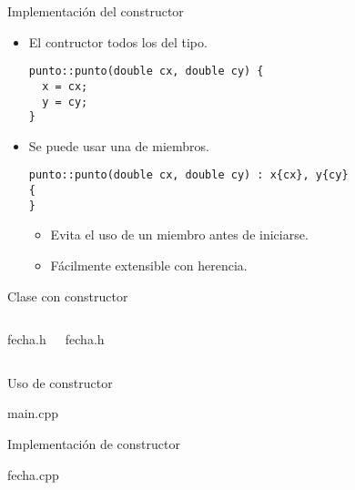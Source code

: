 \begin{frame}[t,fragile]{Implementación del constructor}
\begin{itemize}
  \item El contructor  todos los  del tipo.
\begin{lstlisting}
punto::punto(double cx, double cy) {
  x = cx;
  y = cy;
}
\end{lstlisting}

  \item Se puede usar una  de miembros.
\begin{lstlisting}
punto::punto(double cx, double cy) : x{cx}, y{cy}
{
}
\end{lstlisting}
    \begin{itemize}
      \item Evita el uso de un miembro antes de iniciarse.
      \item Fácilmente extensible con herencia.
    \end{itemize}
\end{itemize}
\end{frame}

\begin{frame}[t]{Clase con constructor}

\begin{columns}[T]

\begin{block}{fecha.h}

\end{block}

\begin{block}{fecha.h}

\end{block}

\end{columns}

\end{frame}

\begin{frame}[t]{Uso de constructor}
\begin{block}{main.cpp}

\end{block}
\end{frame}

\begin{frame}[t]{Implementación de constructor}
\begin{block}{fecha.cpp}

\end{block}
\end{frame}
